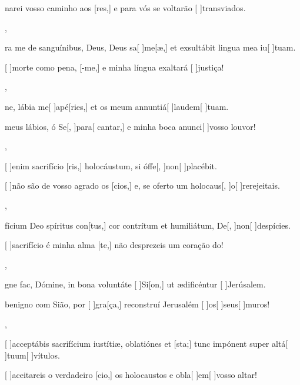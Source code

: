 {    {\item {}narei vosso caminho aos [res,] e para vós se voltarão [ ]{trans}{vi}{a}dos.~\Antiphona},
  {\item {}ra me de sanguínibus, Deus, Deus sa[ ]{me}[\-æ,] et exsultábit lingua mea iu[ ]{tu}am.~\Antiphona}%
    {\item {}[ ]{mor}te como pena, [-me,] e minha língua exaltará [ ]{jus}{ti}ça!~\Antiphona},
  {\item {}ne, lábia me[ ]{a}{pé}[ries,] et os meum annuntiá[ ]{lau}{dem}[ ]{tu}am.~\Antiphona}%
    {\item {} meus lábios, ó Se[, ]{pa}{ra}[ cantar,] e minha boca anunci[ ]{vos}{so lou}vor!~\Antiphona},
  {\item {}[ ]{e}nim sacrifício [ris,] holocáustum, si óffe[, ]{non}[ ]{pla}{cé}bit.~\Antiphona}%
    {\item {}[ ]{não} são de vosso agrado os [cios,] e, se oferto um holocaus[, ]{o}[ ]{re}{rejei}tais.~\Antiphona},
  {\item {}fícium Deo spíritus con[tus,] cor contrítum et humiliátum, De[, ]{non}[ ]{de}{spíci}es.~\Antiphona}%
    {\item {}[ ]{sa}crifício é minha alma [te,] não desprezeis um coração do!~\Antiphona},
  {\item {}gne fac, Dómine, in bona voluntáte [ ]{Si}[\-on,] ut ædificéntur [ ]{Je}{rúsa}lem.~\Antiphona}%
    {\item {} benigno com Sião, por [ ]{gra}[ça,] reconstruí Jerusalém [ ]{os}[ ]{seus}[ ]{mu}ros!~\Antiphona},
  {\item {}[ ]{ac}ceptábis sacrifícium iustítiæ, oblatiónes et [\-sta;] tunc impónent super altá[ ]{tu}{um}[ ]{vítu}\-los.~\Antiphona}%
    {\item {}[ ]{a}ceitareis o verdadeiro [cio,] os holocaustos e obla[ ]{em}[ ]{vos}{so al}tar!~\Antiphona}
}